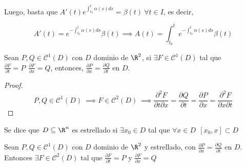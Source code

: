  Luego, basta que $A'(t)e^{\int_{t_0}^t \alpha(s) ds} = \beta(t) \ \forall t \in I$, es decir,

 \[
 A'(t) = e^{-\int_{t_0}^t \alpha(s) ds}\beta(t) \implies A(t) = \int_{t_0}^t e^{-\int_{t_0}^t \alpha(s) ds}\beta(t)
 \]



\begin{nprop}
Sean $P,Q \in \mathscr{C}^1(D)$ con $D$ dominio de $\R^2$, si $\exists F\in \mathscr{C}^1 (D)$ tal que $\frac{\partial F}{\partial t} = P \ \ \frac{\partial F}{\partial x} = Q$, entonces, $\frac{\partial P}{\partial x} = \frac{\partial Q}{\partial t}$ en $D$.
\end{nprop}

\begin{proof}
\[
P,Q \in \mathscr{C}^1 (D) \ \implies F \in \mathscr{C}^2 (D) \ \implies \frac{\partial ^2 F}{\partial t \partial x} = \frac{\partial Q}{\partial t} = \frac{\partial P}{\partial x} = \frac{\partial ^2 F}{\partial x \partial t}
\]
\end{proof}

\begin{ndef}
Se dice que $D \subseteq \R ^n$ es estrellado si $\exists x_0 \in D$ tal que $\forall x \in D \ \ [x_0, x] \subset D$
\end{ndef}

\begin{nth}
Sean $P,Q \in \mathscr{C}^1(D)$ con $D$ dominio de $\R^2$ y estrellado, con $\frac{\partial P}{\partial x} = \frac{\partial Q}{\partial t}$ en $D$.
Entonces $\exists F \in \mathscr{C}^2 (D)$ tal que $\frac{\partial F}{\partial t} = P$ y $\frac{\partial F}{\partial x} = Q$
\end{nth}

